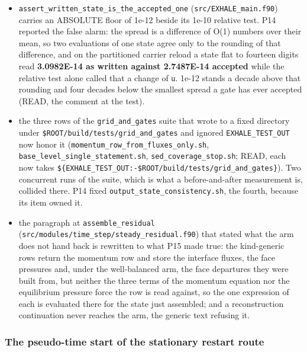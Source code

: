 \documentclass[english,a4paper]{my_memo}
\providecommand{\tightlist}{\setlength{\itemsep}{0pt}\setlength{\parskip}{0pt}}
\begin{document}
\begin{itemize}
\tightlist
\item
  \texttt{assert\_written\_state\_is\_the\_accepted\_one} (\texttt{src/EXHALE\_main.f90}) carries an
  ABSOLUTE floor of 1e-12 beside its 1e-10 relative test. P14 reported the
  false alarm: the spread is a difference of O(1) numbers over their mean, so
  two evaluations of one state agree only to the rounding of that difference,
  and on the partitioned carrier reload a state flat to fourteen digits read
  \textbf{3.0982E-14 as written against 2.7487E-14 accepted} while the relative test
  alone called that a change of \texttt{u}. 1e-12 stands a decade above that rounding
  and four decades below the smallest spread a gate has ever accepted (READ,
  the comment at the test).
\item
  the three rows of the \texttt{grid\_and\_gates} suite that wrote to a fixed directory
  under \texttt{\$ROOT/build/tests/grid\_and\_gates} and ignored \texttt{EXHALE\_TEST\_OUT} now
  honor it (\texttt{momentum\_row\_from\_fluxes\_only.sh},
  \texttt{base\_level\_single\_statement.sh}, \texttt{sed\_coverage\_stop.sh}; READ, each now
  takes \texttt{\$\{EXHALE\_TEST\_OUT:-\$ROOT/build/tests/grid\_and\_gates\}}). Two concurrent
  runs of the suite, which is what a before-and-after measurement is, collided
  there. P14 fixed \texttt{output\_state\_consistency.sh}, the fourth, because its item
  owned it.
\item
  the paragraph at \texttt{assemble\_residual} (\texttt{src/modules/time\_step/steady\_residual.f90})
  that stated what the arm does not hand back is rewritten to what P15 made
  true: the kind-generic rows return the momentum row and store the interface
  fluxes, the face pressures and, under the well-balanced arm, the face
  departures they were built from, but neither the three terms of the momentum
  equation nor the equilibrium pressure force the row is read against, so the
  one expression of each is evaluated there for the state just assembled; and a
  reconstruction continuation never reaches the arm, the generic text refusing
  it.
\end{itemize}

\subsubsection{The pseudo-time start of the stationary restart route}\label{the-pseudo-time-start-of-the-stationary-restart-route}
\end{document}
